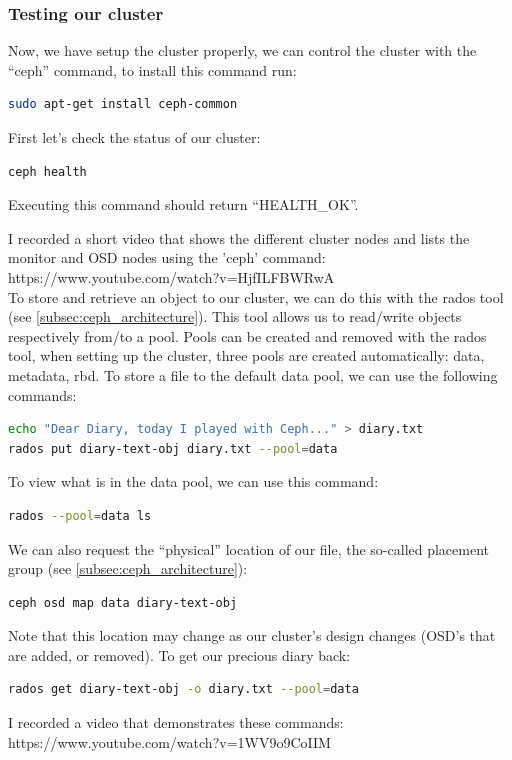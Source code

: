 \documentclass[12pt]{report}
\begin{document}
\subsubsection{Testing our cluster}
Now, we have setup the cluster properly, we can control the cluster
with the ``ceph'' command, to install this command run: 
\begin{lstlisting}[language=bash]
sudo apt-get install ceph-common
\end{lstlisting}
First let's check the status of our cluster:
\begin{lstlisting}[language=bash]
ceph health
\end{lstlisting}
Executing this command should return ``HEALTH\_OK''.

I recorded a short video that shows the different cluster nodes and
lists the monitor and OSD nodes using the 'ceph' command: \\
https://www.youtube.com/watch?v=HjfILFBWRwA\\

To store and retrieve an object to our cluster, we can do this with
the rados tool (see \cref{subsec:ceph_architecture}). This tool allows us to
read/write objects respectively from/to a pool.
Pools can be created and removed with the rados tool, when setting up
the cluster, three pools are created automatically: data, metadata,
rbd.
To store a file to the default data pool, we can use the following
commands:
\begin{lstlisting}[language=bash]
echo "Dear Diary, today I played with Ceph..." > diary.txt
rados put diary-text-obj diary.txt --pool=data
\end{lstlisting}
To view what is in the data pool, we can use this command:
\begin{lstlisting}[language=bash]
rados --pool=data ls
\end{lstlisting}
We can also request the ``physical'' location of our file, the
so-called placement group (see \cref{subsec:ceph_architecture}):
\begin{lstlisting}[language=bash]
ceph osd map data diary-text-obj
\end{lstlisting}
Note that this location may change as our cluster's design changes
(OSD's that are added, or removed).
To get our precious diary back:
\begin{lstlisting}[language=bash]
rados get diary-text-obj -o diary.txt --pool=data
\end{lstlisting}
I recorded a video that demonstrates these commands: \\
https://www.youtube.com/watch?v=1WV9o9CoIIM
\end{document}

